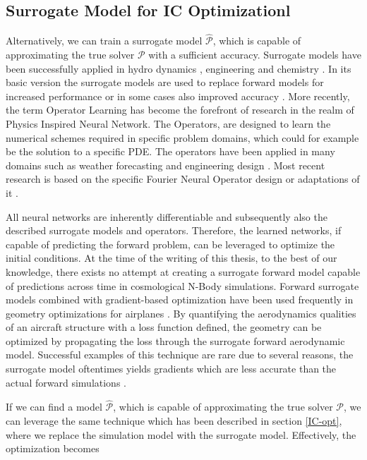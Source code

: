 \documentclass{article}
\begin{document}
\subsection{Surrogate Model for IC Optimizationl}

Alternatively, we can train a surrogate model $\hat{\mathcal{P}}$, which is capable of approximating the true solver $\mathcal{P}$ with a sufficient accuracy. Surrogate models have been successfully applied in hydro dynamics \citep{asher2015review}, engineering \citep{forrester2008engineering} and chemistry \citep{kadupitiya2020machine}. In its basic version the surrogate models are used to replace forward models for increased performance or in some cases also improved accuracy \citep{mcgreivy2024weak}. More recently, the term Operator Learning has become the forefront of research in the realm of Physics Inspired Neural Network. The Operators, are designed to learn the numerical schemes required in specific problem domains, which could for example be the solution to a specific PDE. The operators have been applied in many domains such as weather forecasting \citep{pathak2022fourcastnet} and engineering design \citep{liu2023deepoheat}. Most recent research is based on the specific Fourier Neural Operator design \citep{li2020fourier} or adaptations of it \citep{long2024invertible}. 

All neural networks are inherently differentiable and subsequently also the described surrogate models and operators. Therefore, the learned networks, if capable of predicting the forward problem, can be leveraged to optimize the initial conditions. At the time of the writing of this thesis, to the best of our knowledge, there exists no attempt at creating a surrogate forward model capable of predictions across time in cosmological N-Body simulations. Forward surrogate models combined with gradient-based optimization have been used frequently in geometry optimizations for airplanes \citep{mack2007surrogate}. By quantifying the aerodynamics qualities of an aircraft structure with a loss function defined, the geometry can be optimized by propagating the loss through the surrogate forward aerodynamic model. Successful examples of this technique are rare due to several reasons, the surrogate model oftentimes yields gradients which are less accurate than the actual forward simulations \citep{forrester2009recent}. 

If we can find a model $\hat{\mathcal{P}}$, which is capable of approximating the true solver $\mathcal{P}$, we can leverage the same technique which has been described in section \ref{IC-opt}, where we replace the simulation model with the surrogate model. Effectively, the optimization becomes
\end{document}
